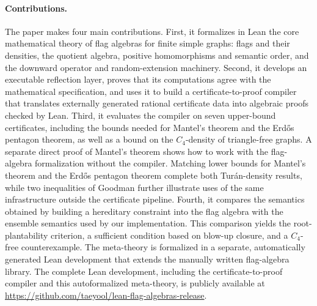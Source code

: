 \documentclass{article}
\begin{document}
\paragraph{Contributions.}
The paper makes four main contributions.  First, it formalizes in Lean the core
mathematical theory of flag algebras for finite simple graphs: flags and their
densities, the quotient algebra, positive homomorphisms and semantic order,
and the downward operator and random-extension machinery.  Second, it develops
an executable reflection layer, proves that its computations agree with the
mathematical specification, and uses it to build a certificate-to-proof compiler
that translates externally generated rational certificate data into algebraic
proofs checked by Lean.  Third, it evaluates the compiler on seven upper-bound
certificates, including the bounds needed for Mantel's theorem and the
Erd\H{o}s pentagon theorem, as well as a bound on the \(C_4\)-density of
triangle-free graphs.  A separate direct proof of Mantel's theorem shows how
to work with the flag-algebra formalization without the compiler.  Matching
lower bounds for Mantel's theorem and the Erd\H{o}s pentagon theorem complete
both Tur\'an-density results, while two inequalities of Goodman further
illustrate uses of the same infrastructure outside the certificate pipeline.
Fourth, it compares the
semantics obtained by building a hereditary constraint into the flag algebra
with the ensemble semantics used by our implementation.  This comparison
yields the root-plantability criterion, a sufficient condition based on
blow-up closure, and a \(C_4\)-free counterexample.  The meta-theory is
formalized in a separate, automatically generated Lean development that
extends the manually written flag-algebra library.  The complete Lean
development, including the certificate-to-proof compiler and this
autoformalized meta-theory, is publicly available at
\url{https://github.com/taeyool/lean-flag-algebras-release}.
\end{document}
